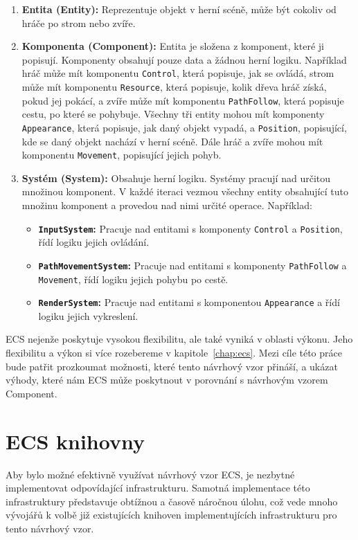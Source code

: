 \begin{enumerate}
    \item \textbf{Entita (Entity):} Reprezentuje objekt v herní scéně, může být cokoliv od hráče po strom nebo zvíře.
    \item \textbf{Komponenta (Component):} Entita je složena z komponent, které ji popisují. Komponenty obsahují pouze data a žádnou herní logiku. Například hráč může mít komponentu \verb|Control|, která popisuje, jak se ovládá, strom může mít komponentu \verb|Resource|, která popisuje, kolik dřeva hráč získá, pokud jej pokácí, a zvíře může mít komponentu \verb|PathFollow|, která popisuje cestu, po které se pohybuje. Všechny tři entity mohou mít komponenty \verb|Appearance|, která popisuje, jak daný objekt vypadá, a \verb|Position|, popisující, kde se daný objekt nachází v herní scéně. Dále hráč a zvíře mohou mít komponentu \verb|Movement|, popisující jejich pohyb.
    \item \textbf{Systém (System):} Obsahuje herní logiku. Systémy pracují nad určitou množinou komponent. V každé iteraci vezmou všechny entity obsahující tuto množinu komponent a provedou nad nimi určité operace. Například:
    \begin{itemize}
        \item \textbf{\verb|InputSystem|:} Pracuje nad entitami s komponenty \verb|Control| a \verb|Position|, řídí logiku jejich ovládání.
        \item \textbf{\verb|PathMovementSystem|:} Pracuje nad entitami s komponenty \verb|PathFollow| a \verb|Movement|, řídí logiku jejich pohybu po cestě.
        \item \textbf{\verb|RenderSystem|:} Pracuje nad entitami s komponentou \verb|Appearance| a řídí logiku jejich vykreslení.
    \end{itemize}
\end{enumerate}

ECS nejenže poskytuje vysokou flexibilitu, ale také vyniká v oblasti výkonu. Jeho flexibilitu a výkon si více rozebereme v kapitole~\cref{chap:ecs}. Mezi cíle této práce bude patřit prozkoumat možnosti, které tento návrhový vzor přináší, a ukázat výhody, které nám ECS může poskytnout v porovnání s návrhovým vzorem Component.

\section{ECS knihovny}
Aby bylo možné efektivně využívat návrhový vzor ECS, je nezbytné implementovat odpovídající infrastrukturu. Samotná implementace této infrastruktury představuje obtížnou a časově náročnou úlohu, což vede mnoho vývojářů k volbě již existujících knihoven implementujících infrastrukturu pro tento návrhový vzor.


